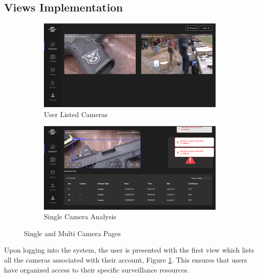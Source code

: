 \subsection{Views Implementation}
\begin{figure}[h]
    \centering
    \begin{subfigure}[b]{0.49\textwidth}
        \centering
        \includegraphics[width=\linewidth]{figs/cameras-list.png}
        \caption{User Listed Cameras}
        \label{fig:camera-list}
    \end{subfigure}
    \hfill %
    \begin{subfigure}[b]{0.49\textwidth}
        \centering
        \includegraphics[width=\linewidth]{figs/camera-page.png}
        \caption{Single Camera Analysis}
        \label{fig:camera-page}
    \end{subfigure}
    \caption{Single and Multi Camera Pages}
    \label{fig:cameras-list-camera-analysis}
\end{figure}

Upon logging into the system, the user is presented with the first view which lists all the cameras 
associated with their account, Figure \ref{fig:camera-list}. This ensures that users have organized access to 
their specific surveillance resources. 

